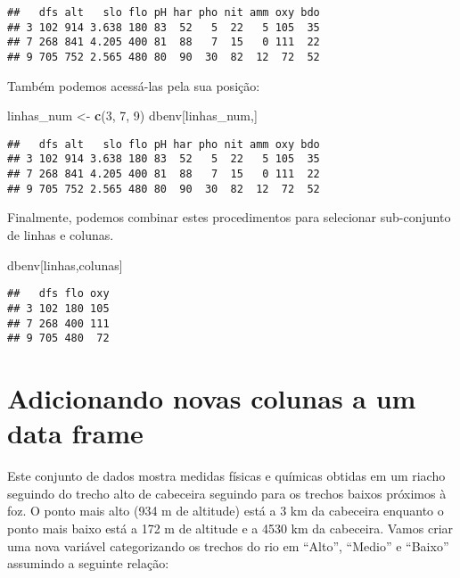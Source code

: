 \documentclass[
]{book}
\newenvironment{Shaded}{\begin{snugshade}}{\end{snugshade}}
\newcommand{\DecValTok}[1]{\textcolor[rgb]{0.00,0.00,0.81}{#1}}
\newcommand{\KeywordTok}[1]{\textcolor[rgb]{0.13,0.29,0.53}{\textbf{#1}}}
\newcommand{\NormalTok}[1]{#1}
\newcommand{\StringTok}[1]{\textcolor[rgb]{0.31,0.60,0.02}{#1}}
\begin{document}
\begin{verbatim}
##   dfs alt   slo flo pH har pho nit amm oxy bdo
## 3 102 914 3.638 180 83  52   5  22   5 105  35
## 7 268 841 4.205 400 81  88   7  15   0 111  22
## 9 705 752 2.565 480 80  90  30  82  12  72  52
\end{verbatim}

Também podemos acessá-las pela sua posição:

\begin{Shaded}
\begin{Highlighting}[]
\NormalTok{linhas_num <-}\StringTok{ }\KeywordTok{c}\NormalTok{(}\DecValTok{3}\NormalTok{, }\DecValTok{7}\NormalTok{, }\DecValTok{9}\NormalTok{)}
\NormalTok{dbenv[linhas_num,]}
\end{Highlighting}
\end{Shaded}

\begin{verbatim}
##   dfs alt   slo flo pH har pho nit amm oxy bdo
## 3 102 914 3.638 180 83  52   5  22   5 105  35
## 7 268 841 4.205 400 81  88   7  15   0 111  22
## 9 705 752 2.565 480 80  90  30  82  12  72  52
\end{verbatim}

Finalmente, podemos combinar estes procedimentos para selecionar sub-conjunto de linhas e colunas.

\begin{Shaded}
\begin{Highlighting}[]
\NormalTok{dbenv[linhas,colunas]}
\end{Highlighting}
\end{Shaded}

\begin{verbatim}
##   dfs flo oxy
## 3 102 180 105
## 7 268 400 111
## 9 705 480  72
\end{verbatim}

\hypertarget{adicionando-novas-colunas-a-um-data-frame}{%
\section{Adicionando novas colunas a um data frame}\label{adicionando-novas-colunas-a-um-data-frame}}

Este conjunto de dados mostra medidas físicas e químicas obtidas em um riacho seguindo do trecho alto de cabeceira seguindo para os trechos baixos próximos à foz. O ponto mais alto (934 m de altitude) está a 3 km da cabeceira enquanto o ponto mais baixo está a 172 m de altitude e a 4530 km da cabeceira. Vamos criar uma nova variável categorizando os trechos do rio em ``Alto'', ``Medio'' e ``Baixo'' assumindo a seguinte relação:
\end{document}
